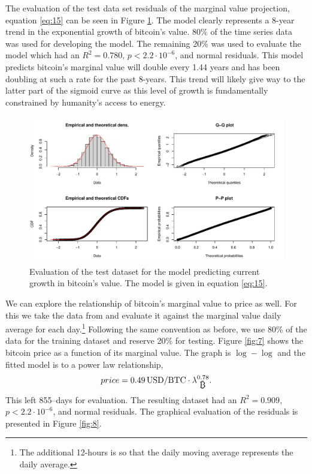 \documentclass[runningheads]{llncs}
\def\bitcoin{
    \leavevmode
    \vtop{\offinterlineskip %
    \setbox0=\hbox{B}
    \setbox2=\hbox to\wd0{\hfil\hskip-.03em
    \vrule height .3ex width .15ex\hskip .08em
    \vrule height .3ex width .15ex\hfil}
    \vbox{\copy2\box0}\box2}
}
\begin{document}
The evaluation of the test data set residuals of the marginal value projection, equation \ref{eq:15} can be seen in Figure \ref{fig:6}.
The model clearly represents a 8-year trend in the exponential growth of bitcoin's value.
80\% of the time series data was used for developing the model.
The remaining 20\% was used to evaluate the model which had an $R^2=0.780$, $p<2.2\cdot10^{-6}$, and normal residuals.
This model predicts bitcoin's marginal value will double every 1.44 years and has been doubling at such a rate for the past 8-years.
This trend will likely give way to the latter part of the sigmoid curve as this level of growth is fundamentally constrained by humanity's access to energy.

\begin{figure}
    \includegraphics[width=\textwidth]{BTC Marginal Utility Projection Test Fit Evaluation.pdf}
    \caption{Evaluation of the test dataset for the model predicting current growth in bitcoin's value.
        The model is given in equation \ref{eq:15}.} \label{fig:6}
\end{figure}

We can explore the relationship of bitcoin's marginal value to price as well.
For this we take the data from \cite{coin2022btcusd} and evaluate it against the marginal value daily average for each day.\footnote{
    The additional 12-hours is so that the daily moving average represents the daily average.
}
Following the same convention as before, we use 80\% of the data for the training dataset and reserve 20\% for testing.
Figure \ref{fig:7} shows the bitcoin price as a function of its marginal value.
The graph is $\log - \log$ and the fitted model is to a power law relationship,
\begin{equation}
    price = 0.49 \, \mathrm{USD/BTC} \cdot \lambda_{\mbox{\bitcoin}}^{0.78}.\label{eq:16}
\end{equation}
This left 855--days for evaluation.
The resulting dataset had an $R^2=0.909$, $p<2.2 \cdot 10^{-6}$, and normal residuals.
The graphical evaluation of the residuals is presented in Figure \ref{fig:8}.
\end{document}
